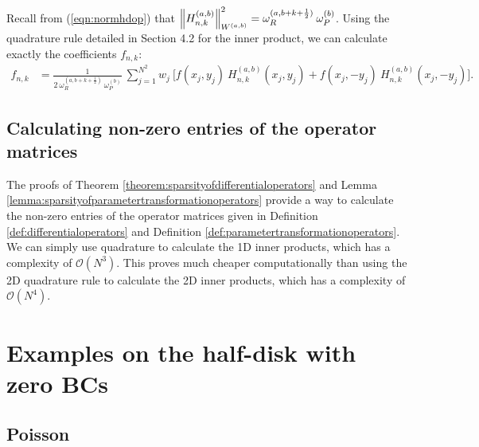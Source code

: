 \documentclass[11pt, oneside]{article}   	%
\newcommand{\bigO}{\mathcal{O}}
\newcommand{\half}{\frac{1}{2}}
\newcommand{\hdop}{H}
\newcommand{\hdopnk}{\hdop_{n,k}}
\newcommand{\hdopnkab}{\hdop_{n,k}^{(a,b)}}
\newcommand{\Wab}{{W^{(a,b)}}}
\newcommand{\genjac}{R}
\newcommand{\normgenjac}{\omega_\genjac}
\newcommand{\normjac}{\omega_P}
\begin{document}
Recall from (\ref{eqn:normhdop}) that $\norm{\hdopnkab}^2_\Wab = \normgenjac^{(a,b+k+\half)} \: \normjac^{(b)}$. Using the quadrature rule detailed in Section 4.2 for the inner product, we can calculate exactly the coefficients $f_{n,k}$: 
\begin{align*}
	f_{n,k} &= \frac{1}{2 \: \normgenjac^{(a,b+k+\half)} \: \normjac^{(b)}} \: \sum_{j=1}^{N^2} w_j \: \big[ f(x_j, y_j) \: \hdopnk^{(a,b)}(x_j, y_j) +f(x_j, -y_j) \: \hdopnk^{(a,b)}(x_j, -y_j) \big].
\end{align*}


\subsection{Calculating non-zero entries of the operator matrices}\label{subsection:Computation-operatormatrices}

The proofs of Theorem \ref{theorem:sparsityofdifferentialoperators} and Lemma \ref{lemma:sparsityofparametertransformationoperators} provide a way to calculate the non-zero entries of the operator matrices given in Definition \ref{def:differentialoperators} and Definition \ref{def:parametertransformationoperators}. We can simply use quadrature to calculate the 1D inner products, which has a complexity of $\bigO(N^3)$. This proves much cheaper computationally than using the 2D quadrature rule to calculate the 2D inner products, which has a complexity of $\bigO(N^4)$. 


%
\section{Examples on the half-disk with zero BCs}\label{Section:Examples}


\subsection{Poisson}
\end{document}
